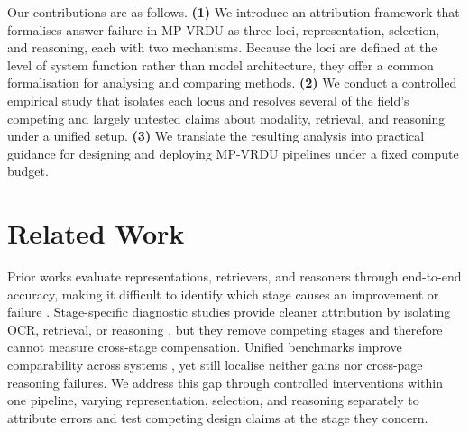 \documentclass[11pt]{article}
\begin{document}
Our contributions are as follows. \textbf{(1)} We introduce an attribution framework that formalises answer failure in MP-VRDU as three loci, representation, selection, and reasoning, each with two mechanisms. Because the loci are defined at the level of system function rather than model architecture, they offer a common formalisation for analysing and comparing methods. \textbf{(2)} We conduct a controlled empirical study that isolates each locus and resolves several of the field's competing and largely untested claims about modality, retrieval, and reasoning under a unified setup. \textbf{(3)} We translate the resulting analysis into practical guidance for designing and deploying MP-VRDU pipelines under a fixed compute budget.

\section{Related Work}
\label{sec:relatedwork}

Prior works evaluate representations, retrievers, and reasoners through end-to-end accuracy, making it difficult to identify which stage causes an improvement or failure \citep{tanaka2025vdocrag,han2025mdocagent,suri2025visdom,yan2025docseeker}. Stage-specific diagnostic studies provide cleaner attribution by isolating OCR, retrieval, or reasoning \citep{zhang2025ohrbench,zarrinkia2026reasoningbottleneck}, but they remove competing stages and therefore cannot measure cross-stage compensation. Unified benchmarks improve comparability across systems \citep{peng2025unidocbench}, yet still localise neither gains nor cross-page reasoning failures. We address this gap through controlled interventions within one pipeline, varying representation, selection, and reasoning separately to attribute errors and test competing design claims at the stage they concern.

\end{document}
